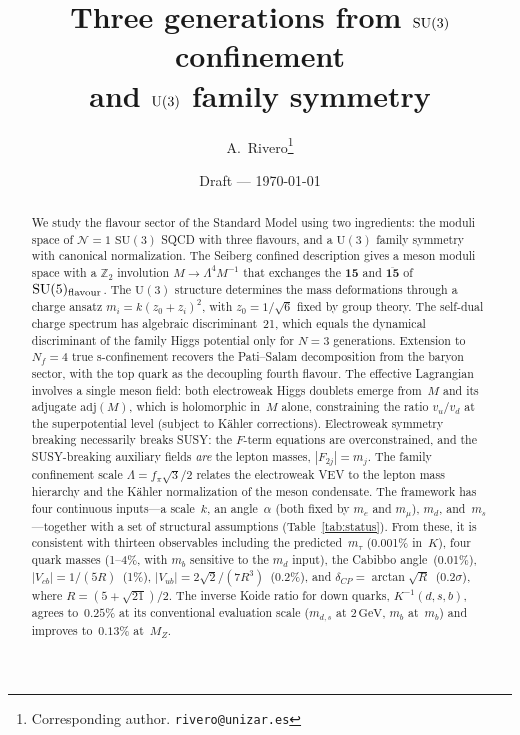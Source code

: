 \documentclass[12pt,a4paper]{article}
\title{Three generations from $\SU(3)$ confinement\\
  and $\UU(3)$ family symmetry}
\author{A.\ Rivero\thanks{Corresponding author. \texttt{rivero@unizar.es}}}
\date{Draft --- \today}
\newcommand{\SU}{\mathrm{SU}}
\newcommand{\UU}{\mathrm{U}}
\newcommand{\Nf}{N_f}
\newcommand{\adj}{\mathrm{adj}}
\newcommand{\GeV}{\,\mathrm{GeV}}
\begin{document}
\maketitle

\begin{abstract}
  We study the flavour sector of the Standard Model using two
  ingredients: the moduli space of $\mathcal{N}=1$ $\SU(3)$ SQCD with
  three flavours, and a $\UU(3)$ family symmetry with canonical
  normalization. The Seiberg confined description gives a meson moduli
  space with a $\mathbb{Z}_2$ involution $M \to \Lambda^4 M^{-1}$ that
  exchanges the $\mathbf{15}$ and $\overline{\mathbf{15}}$ of
  $\SU(5)_{\rm flavour}$. The $\UU(3)$ structure determines the mass
  deformations through a charge ansatz $m_i = k(z_0 + z_i)^2$, with
  $z_0 = 1/\sqrt{6}$ fixed by group theory. The self-dual charge
  spectrum has algebraic discriminant~21, which equals the dynamical
  discriminant of the family Higgs potential only for $N=3$
  generations. Extension to $\Nf=4$ true s-confinement recovers the
  Pati--Salam decomposition from the baryon sector, with the top quark
  as the decoupling fourth flavour. The effective Lagrangian involves a
  single meson field: both electroweak Higgs doublets emerge from~$M$
  and its adjugate $\adj(M)$, which is holomorphic in~$M$ alone,
  constraining the ratio $v_u/v_d$ at the superpotential level
  (subject to K\"ahler corrections).
  Electroweak symmetry breaking necessarily breaks SUSY:
  the $F$-term equations are overconstrained, and the
  SUSY-breaking auxiliary fields \emph{are} the lepton masses,
  $|F_{2j}| = m_j$.
  The family confinement
  scale $\Lambda = f_\pi\sqrt{3}/2$ relates the electroweak VEV to
  the lepton mass hierarchy and the K\"ahler normalization of the
  meson condensate.
  The framework has four continuous inputs---a scale~$k$, an
  angle~$\alpha$ (both fixed by $m_e$ and $m_\mu$),
  $m_d$, and~$m_s$---together with a set of
  structural assumptions (Table~\ref{tab:status}).
  From these, it is consistent with thirteen observables including
  the predicted~$m_\tau$ (0.001\% in~$K$), four quark masses (1--4\%, with $m_b$
  sensitive to the $m_d$ input), the
  Cabibbo angle~(0.01\%), $|V_{cb}| = 1/(5R)$~(1\%),
  $|V_{ub}| = 2\sqrt{2}/(7R^3)$~(0.2\%), and
  $\delta_{CP} = \arctan\sqrt{R}$~($0.2\sigma$), where
  $R = (5+\sqrt{21})/2$.
  The inverse Koide ratio for down quarks,
  $K^{-1}(d,s,b)$, agrees to~$0.25\%$ at its conventional
  evaluation scale ($m_{d,s}$ at $2\GeV$, $m_b$ at~$m_b$) and
  improves to~$0.13\%$ at~$M_Z$.
\end{abstract}
\end{document}
